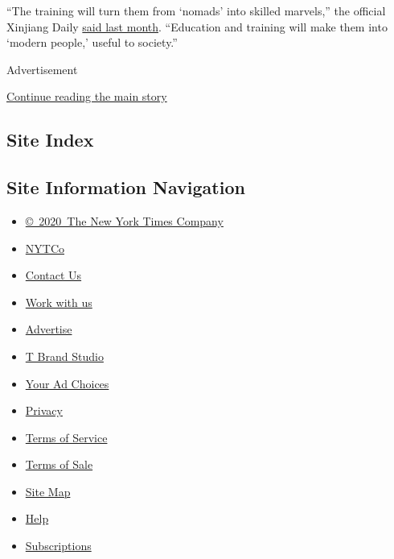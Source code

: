 ``The training will turn them from `nomads' into skilled marvels,'' the
official Xinjiang Daily
\href{http://wap.xjdaily.com/xjrb/20181111/118479.html}{said last
month}. ``Education and training will make them into `modern people,'
useful to society.''

Advertisement

\protect\hyperlink{after-bottom}{Continue reading the main story}

\hypertarget{site-index}{%
\subsection{Site Index}\label{site-index}}

\hypertarget{site-information-navigation}{%
\subsection{Site Information
Navigation}\label{site-information-navigation}}

\begin{itemize}
\tightlist
\item
  \href{https://help.nytimes3xbfgragh.onion/hc/en-us/articles/115014792127-Copyright-notice}{©~2020~The
  New York Times Company}
\end{itemize}

\begin{itemize}
\tightlist
\item
  \href{https://www.nytco.com/}{NYTCo}
\item
  \href{https://help.nytimes3xbfgragh.onion/hc/en-us/articles/115015385887-Contact-Us}{Contact
  Us}
\item
  \href{https://www.nytco.com/careers/}{Work with us}
\item
  \href{https://nytmediakit.com/}{Advertise}
\item
  \href{http://www.tbrandstudio.com/}{T Brand Studio}
\item
  \href{https://www.nytimes3xbfgragh.onion/privacy/cookie-policy\#how-do-i-manage-trackers}{Your
  Ad Choices}
\item
  \href{https://www.nytimes3xbfgragh.onion/privacy}{Privacy}
\item
  \href{https://help.nytimes3xbfgragh.onion/hc/en-us/articles/115014893428-Terms-of-service}{Terms
  of Service}
\item
  \href{https://help.nytimes3xbfgragh.onion/hc/en-us/articles/115014893968-Terms-of-sale}{Terms
  of Sale}
\item
  \href{https://spiderbites.nytimes3xbfgragh.onion}{Site Map}
\item
  \href{https://help.nytimes3xbfgragh.onion/hc/en-us}{Help}
\item
  \href{https://www.nytimes3xbfgragh.onion/subscription?campaignId=37WXW}{Subscriptions}
\end{itemize}
